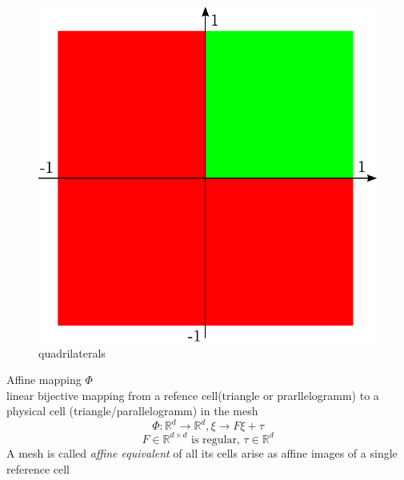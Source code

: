 \documentclass[english]{article}
\theoremstyle{definition}
\theoremstyle{remark}
\newcommand{\RR}{\mathbb{R}}			%
\newcommand{\tx}[1]{\text{#1}}
\begin{document}
\begin{figure}[tbh]
  \begin{center}
    \includegraphics[width=\textwidth]{figs/quadrilaterals.pdf}
  \end{center}
  \caption{quadrilaterals}
  \label{quadrilaterals-figure}
\end{figure}

Affine mapping $\Phi$\\
linear bijective mapping from a refence cell(triangle or prarllelogramm) to a physical cell (triangle/parallelogramm) in the mesh $$\Phi : \RR^d \to \RR^d , \xi \to F \xi + \tau$$
$$F \in \RR^{d\times d} \tx{ is regular, } \tau \in \RR^d$$
A mesh is called \emph{affine equivalent} of all its cells arise as affine images of a single reference cell
\end{document}
